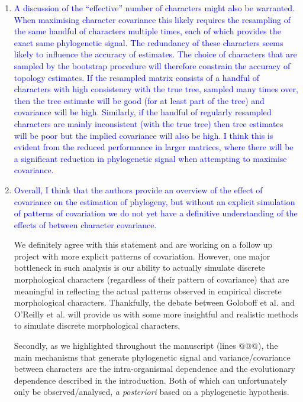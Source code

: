 \documentclass[12pt,letterpaper]{article}
\begin{document}
\begin{enumerate}

\item{\textcolor{blue}{A discussion of the ``effective'' number of characters might also be warranted. When maximising character covariance this likely requires the resampling of the same handful of characters multiple times, each of which provides the exact same phylogenetic signal. The redundancy of these characters seems likely to influence the accuracy of estimates. The choice of characters that are sampled by the bootstrap procedure will therefore constrain the accuracy of topology estimates. If the resampled matrix consists of a handful of characters with high consistency with the true tree, sampled many times over, then the tree estimate will be good (for at least part of the tree) and covariance will be high. Similarly, if the handful of regularly resampled characters are mainly inconsistent (with the true tree) then tree estimates will be poor but the implied covariance will also be high. I think this is evident from the reduced performance in larger matrices, where there will be a significant reduction in phylogenetic signal when attempting to maximise covariance.}}


\item{\textcolor{blue}{Overall, I think that the authors provide an overview of the effect of covariance on the estimation of phylogeny, but without an explicit simulation of patterns of covariation we do not yet have a definitive understanding of the effects of between character covariance.}}

We definitely agree with this statement and are working on a follow up project with more explicit patterns of covariation.
However, one major bottleneck in such analysis is our ability to actually simulate discrete morphological characters (regardless of their pattern of covariance) that are meaningful in reflecting the actual patterns observed in empirical discrete morphological characters.
Thankfully, the debate between Goloboff et al. and O'Reilly et al. will provide us with some more insightful and realistic methods to simulate discrete morphological characters.

Secondly, as we highlighted throughout the manuscript (lines @@@), the main mechanisms that generate phylogenetic signal and variance/covariance between characters are the intra-organismal dependence and the evolutionary dependence described in the introduction.
Both of which can unfortunately only be observed/analysed, \textit{a posteriori} based on a phylogenetic hypothesis.


\end{enumerate}
\end{document}
